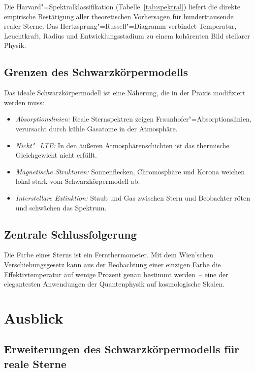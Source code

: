 ﻿\documentclass[a4paper,12pt]{article}
\theoremstyle{definition}
\begin{document}
Die Harvard"=Spektralklassifikation (Tabelle~\ref{tab:spektral}) liefert
die direkte empirische Bestätigung aller theoretischen Vorhersagen für
hunderttausende realer Sterne. Das Hertzsprung"=Russell"=Diagramm
verbindet Temperatur, Leuchtkraft, Radius und Entwicklungsstadium
zu einem kohärenten Bild stellarer Physik.

\subsection{Grenzen des Schwarzkörpermodells}

Das ideale Schwarzkörpermodell ist eine Näherung, die in der Praxis
modifiziert werden muss:
\begin{itemize}
    \item \emph{Absorptionslinien:} Reale Sternspektren zeigen Fraunhofer"=Absorptionslinien,
          verursacht durch kühle Gasatome in der Atmosphäre.
    \item \emph{Nicht"=LTE:} In den äußeren Atmosphärenschichten ist das
          thermische Gleichgewicht nicht erfüllt.
    \item \emph{Magnetische Strukturen:} Sonnenflecken, Chromosphäre und
          Korona weichen lokal stark vom Schwarzkörpermodell ab.
    \item \emph{Interstellare Extinktion:} Staub und Gas zwischen Stern und
          Beobachter röten und schwächen das Spektrum.
\end{itemize}

\subsection{Zentrale Schlussfolgerung}

Die Farbe eines Sterns ist ein Fernthermometer. Mit dem Wien'schen
Verschiebungsgesetz kann aus der Beobachtung einer einzigen Farbe die
Effektivtemperatur auf wenige Prozent genau bestimmt werden~-- eine
der elegantesten Anwendungen der Quantenphysik auf kosmologische Skalen.

\section{Ausblick}

\subsection{Erweiterungen des Schwarzkörpermodells für reale Sterne}
\end{document}
